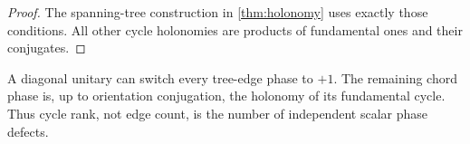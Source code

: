 \begin{proof}
The spanning-tree construction in \cref{thm:holonomy} uses exactly
those conditions.  All other cycle holonomies are products of
fundamental ones and their conjugates.
\end{proof}

\begin{remark}
A diagonal unitary can switch every tree-edge phase to \(+1\).  The
remaining chord phase is, up to orientation conjugation, the holonomy
of its fundamental cycle.  Thus cycle rank, not edge count, is the
number of independent scalar phase defects.
\end{remark}
